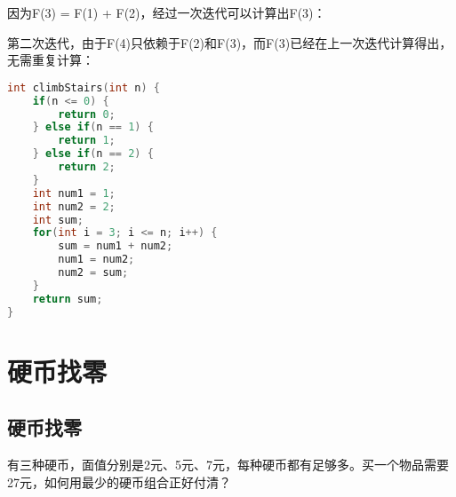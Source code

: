 因为F(3) = F(1) + F(2)，经过一次迭代可以计算出F(3)：

\begin{table}[H]
	\centering
\end{table}

第二次迭代，由于F(4)只依赖于F(2)和F(3)，而F(3)已经在上一次迭代计算得出，无需重复计算：

\begin{table}[H]
	\centering
\end{table}


\begin{lstlisting}[language=C]
int climbStairs(int n) {
    if(n <= 0) {
        return 0;
    } else if(n == 1) {
        return 1;
    } else if(n == 2) {
        return 2;
    }
    int num1 = 1;
    int num2 = 2;
    int sum;
    for(int i = 3; i <= n; i++) {
        sum = num1 + num2;
        num1 = num2;
        num2 = sum;
    }
    return sum;
}
\end{lstlisting}

\newpage

\section{硬币找零}

\subsection{硬币找零}

有三种硬币，面值分别是2元、5元、7元，每种硬币都有足够多。买一个物品需要27元，如何用最少的硬币组合正好付清？\\

